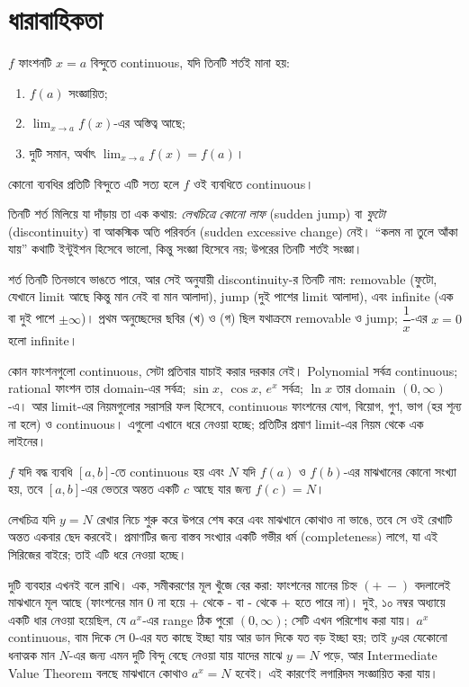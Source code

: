 \documentclass[11pt]{article}
\begin{document}
\section{ধারাবাহিকতা}

\begin{idea}[Continuity]
$f$ ফাংশনটি $x = a$ বিন্দুতে continuous, যদি তিনটি শর্তই মানা হয়:
\begin{enumerate}
  \item $f(a)$ সংজ্ঞায়িত;
  \item $\lim_{x \to a} f(x)$-এর অস্তিত্ব আছে;
  \item দুটি সমান, অর্থাৎ $\lim_{x \to a} f(x) = f(a)$।
\end{enumerate}
কোনো ব্যবধির প্রতিটি বিন্দুতে এটি সত্য হলে $f$ ওই ব্যবধিতে continuous।
\end{idea}

তিনটি শর্ত মিলিয়ে যা দাঁড়ায় তা এক কথায়: \emph{লেখচিত্রে কোনো লাফ} (sudden jump) বা \emph{ফুটো} (discontinuity) বা আকস্মিক অতি পরিবর্তন (sudden excessive change) নেই। ``কলম না তুলে আঁকা যায়'' কথাটি ইন্টুইশন হিসেবে ভালো, কিন্তু
সংজ্ঞা হিসেবে নয়; উপরের তিনটি শর্তই সংজ্ঞা।

শর্ত তিনটি তিনভাবে ভাঙতে পারে, আর সেই অনুযায়ী discontinuity-র তিনটি নাম:
removable (ফুটো, যেখানে limit আছে কিন্তু মান নেই বা মান আলাদা), jump (দুই
পাশের limit আলাদা), এবং infinite (এক বা দুই পাশে $\pm\infty$)। প্রথম
অনুচ্ছেদের ছবির (খ) ও (গ) ছিল যথাক্রমে removable ও jump; $\dfrac{1}{x}$-এর
$x=0$ হলো infinite।

কোন ফাংশনগুলো continuous, সেটা প্রতিবার যাচাই করার দরকার নেই। Polynomial সর্বত্র
continuous; rational ফাংশন তার domain-এর সর্বত্র; $\sin x$, $\cos x$, $e^{x}$
সর্বত্র; $\ln x$ তার domain $(0,\infty)$-এ। আর limit-এর নিয়মগুলোর সরাসরি ফল
হিসেবে, continuous ফাংশনের যোগ, বিয়োগ, গুণ, ভাগ (হর শূন্য না হলে) ও continuous। এগুলো এখানে ধরে নেওয়া হচ্ছে; প্রতিটির প্রমাণ
limit-এর নিয়ম থেকে এক লাইনের।

\begin{idea}
$f$ যদি বদ্ধ ব্যবধি $[a,b]$-তে continuous হয় এবং $N$ যদি $f(a)$ ও $f(b)$-এর
মাঝখানের কোনো সংখ্যা হয়, তবে $[a,b]$-এর ভেতরে অন্তত একটি $c$ আছে যার জন্য
$f(c) = N$।
\end{idea}

লেখচিত্র যদি $y = N$ রেখার নিচে শুরু করে উপরে শেষ করে
এবং মাঝখানে কোথাও না ভাঙে, তবে সে ওই রেখাটি অন্তত একবার ছেদ করবেই। প্রমাণটির
জন্য বাস্তব সংখ্যার একটি গভীর ধর্ম (completeness) লাগে, যা এই সিরিজের বাইরে;
তাই এটি ধরে নেওয়া হচ্ছে।

দুটি ব্যবহার এখনই বলে রাখি। এক, সমীকরণের মূল খুঁজে বের করা: ফাংশনের মানের চিহ্ন $(+\,-)$ বদলালেই
মাঝখানে মূল আছে (ফাংশনের মান 0 না হয়ে + থেকে - বা - থেকে + হতে পারে না)। দুই, ১০ নম্বর অধ্যায়ে একটি ধার নেওয়া হয়েছিল, যে
$a^{x}$-এর range ঠিক পুরো $(0,\infty)$; সেটি এখন পরিশোধ করা যায়। $a^{x}$
continuous, বাম দিকে সে $0$-এর যত কাছে ইচ্ছা যায় আর ডান দিকে যত বড় ইচ্ছা হয়;
তাই $y$এর যেকোনো ধনাত্মক মান $N$-এর জন্য এমন দুটি বিন্দু বেছে নেওয়া যায় যাদের মাঝে $y=N$
পড়ে, আর Intermediate Value Theorem বলছে মাঝখানে কোথাও $a^{x} = N$ হবেই।
এই কারণেই লগারিদম সংজ্ঞায়িত করা যায়।
\end{document}

